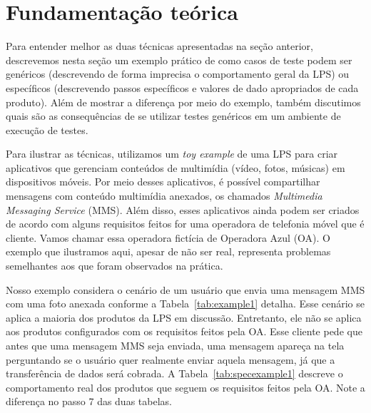 \section{Fundamenta\c{c}\~ao te\'orica}

\label{sec:fundamentacao}
Para entender melhor as duas técnicas apresentadas na seção anterior,
descrevemos nesta seção um exemplo prático de como casos de teste podem ser
genéricos (descrevendo de forma imprecisa o comportamento geral da LPS) ou
específicos (descrevendo passos específicos e valores de dado apropriados de
cada produto). Além de mostrar a diferença por meio do exemplo, também discutimos
quais são as consequências de se utilizar testes genéricos em um ambiente de
execução de testes. 

Para ilustrar as técnicas, utilizamos um \emph{toy example} de uma LPS para
criar aplicativos que gerenciam conteúdos de multimídia (vídeo, fotos, músicas) em
dispositivos móveis. Por meio desses aplicativos, é possível compartilhar mensagens
com conteúdo multimídia anexados, os chamados \emph{Multimedia Messaging
Service} (MMS). Além disso, esses aplicativos ainda podem ser criados de acordo
com alguns requisitos feitos for uma operadora de telefonia móvel que é cliente.
Vamos chamar essa operadora fictícia de Operadora Azul (OA). O exemplo que
ilustramos aqui, apesar de não ser real, representa problemas semelhantes aos que foram
observados na prática.

Nosso exemplo considera o cenário de um usuário que envia uma mensagem MMS com
uma foto anexada conforme a Tabela~\ref{tab:example1} detalha. Esse cenário
se aplica a maioria dos produtos da LPS em discussão. Entretanto, ele não se
aplica aos produtos configurados com os requisitos feitos pela OA. Esse cliente
pede que antes que uma mensagem MMS seja enviada, uma mensagem apareça na tela
perguntando se o usuário quer realmente enviar aquela mensagem, já que a
transferência de dados será cobrada. A Tabela~\ref{tab:specexample1} descreve o
comportamento real dos produtos que seguem os requisitos feitos pela OA. Note a
diferença no passo 7 das duas tabelas.


